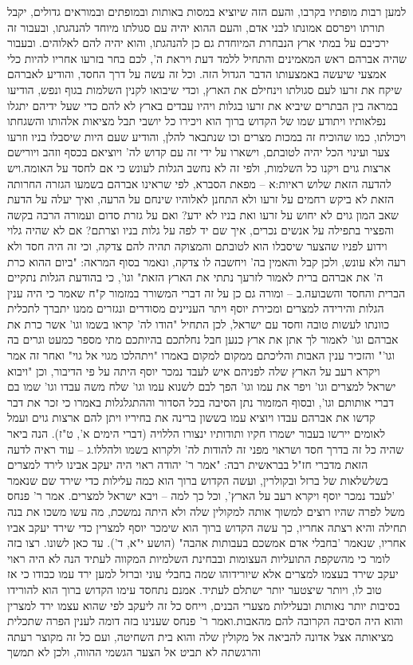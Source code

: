\documentclass[12pt, openany]{book}
\begin{document}
למען רבות מופתיו בקרבו, והעם הזה שיוציא במסות באותות ובמופתים ובמוראים גדולים, יקבל תורתו ויפרסם אמונתו לבני אדם, והעם ההוא יהיה עם סגולתו מיוחד להנהגתו, ובעבור זה ירכיבם על במתי ארץ הנבחרת המיוחדת גם כן להנהגתו, והוא יהיה להם לאלוהים. ובעבור שהיה אברהם ראש המאמינים והתחיל ללמד דעת ויראת ה', לכם בחר בזרעו אחריו להיות כלי אמצעי שיעשה באמצעותו הדבר הגדול הזה. וכל זה עשה על דרך החסד, והודיע לאברהם שיקח את זרעו לעם סגולתו וינחילם את הארץ, וכדי שיבואו לקנין השלמות בגוף ונפש, הודיעו במראה בין הבתרים שיביא את זרעו בגלות ויהיו עבדים בארץ לא להם כדי שעל ידיהם יתגלו נפלאותיו ויתודע שמו של הקדוש ברוך הוא ויכירו כל יושבי תבל מציאות אלהותו והשגחתו ויכולתו, כמו שהוכיח זה במכות מצרים וכו שנתבאר להלן, והודיע שעם היות שיסבלו בניו וזרעו צער ועינוי הכל יהיה לטובתם, וישארו על ידי זה עם קדוש לה' ויוציאם בכסף וזהב ויורישם ארצות גוים ויקנו כל השלמות, ולפי זה לא נחשב הגלות לעונש כי אם לחסד על האומה.ויש להדעה הזאת שלוש ראיות:א – מפאת הסברא, לפי שראינו אברהם בשמעו הגזרה החרותה הזאת לא ביקש רחמים על זרעו ולא התחנן לאלוהיו שינחם על הרעה, ואיך יעלה על הדעת שאב המון גוים לא יחוש על זרעו ואת בניו לא ידע? ואם על גזרת סדום ועמורה הרבה בקשה והפציר בתפילה על אנשים נכרים, איך שם יד לפה על גלות בניו וצרתם? אם לא שהיה גלוי וידוע לפניו שהצער שיסבלו הוא לטובתם והמצוקה תהיה להם צדקה, וכי זה היה חסד ולא רעה ולא עונש, ולכן קבל והאמין בה' ויחשבה לו צדקה, ונאמר בסוף המראה: "ביום ההוא כרת ה' את אברהם ברית לאמור לזרעך נתתי את הארץ הזאת" וגו', כי בהודעת הגלות נתקיים הברית והחסד והשבועה.ב – ומורה גם כן על זה דברי המשורר במזמור ק"ח שאמר כי היה ענין הגלות והירידה למצרים ומכירת יוסף ויתר העניינים מסודרים ונגזרים ממנו יתברך לתכלית כוונתו לעשות טובה וחסד עם ישראל, לכן התחיל "הודו לה' קראו בשמו וגו' אשר כרת את אברהם וגו' לאמור לך אתן את ארץ כנען חבל נחלתכם בהיותכם מתי מספר כמעט וגרים בה וגו'" והזכיר ענין האבות והליכתם ממקום למקום באמרו "ויתהלכו מגוי אל גוי" ואחר זה אמר ויקרא רעב על הארץ שלה לפניהם איש לעבד נמכר יוסף היתה על פי הדיבור, וכן "ויבוא ישראל למצרים וגו' ויפר את עמו וגו' הפך לבם לשנוא עמו וגו' שלח משה עבדו וגו' שמו בם דברי אותותם וגו', ובסוף המזמור נתן הסיבה בכל הסדור וההתגלגלות באמרו כי זכר את דבר קדשו את אברהם עבדו ויוציא עמו בששון ברינה את בחיריו ויתן להם ארצות גוים ועמל לאומים יירשו בעבור ישמרו חקיו ותודותיו ינצורו הללויה (דברי הימים א', ט"ז). הנה ביאר שהיה כל זה בדרך חסד ושראוי מפני זה להודות לה' ולקרוא בשמו ולהללו.ג – עוד ראיה לדעה הזאת מדברי חז"ל בבראשית רבה: "אמר ר' יהודה ראוי היה יעקב אבינו לירד למצרים בשלשלאות של ברזל ובקולרין, ועשה הקדוש ברוך הוא כמה עלילות כדי שירד שם שנאמר 'לעבד נמכר יוסף ויקרא רעב על הארץ', וכל כך למה – ויבא ישראל למצרים. אמר ר' פנחס משל לפרה שהיו רוצים למשוך אותה למקולין שלה ולא היתה נמשכת, מה עשו משכו את בנה תחילה והיא רצתה אחריו, כך עשה הקדוש ברוך הוא שימכר יוסף למצרין כדי שירד יעקב אביו אחריו, שנאמר 'בחבלי אדם אמשכם בעבותות אהבה" (הושע י"א, ד'). עד כאן לשונו. רצו בזה לומר כי מהשקפת התועליות העצומות ובבחינת השלמיות המקווה לעתיד הנה לא היה ראוי יעקב שירד בעצמו למצרים אלא שיורידוהו שמה בחבלי עוני וברזל למען ירד עמו כבודו כי אז טוב לו, ויותר שיצטער יותר ישתלם לעתיד. אמנם נתחסד עימו הקדוש ברוך הוא להורידו בסיבות יותר נאותות ובעלילות מצערי הבנים, וייחס כל זה ליעקב לפי שהוא עצמו ירד למצרין והוא היה הסיבה הקרובה להם מהאבות.ואמר ר' פנחס שענינו בזה דומה לענין הפרה שתכלית מציאותה אצל אדונה להביאה אל מקולין שלה והוא בית השחיטה, ועם כל זה מקוצר רעתה והרגשתה לא תביט אל הצער הגשמי ההווה, ולכן לא תמשך 
\end{document}
